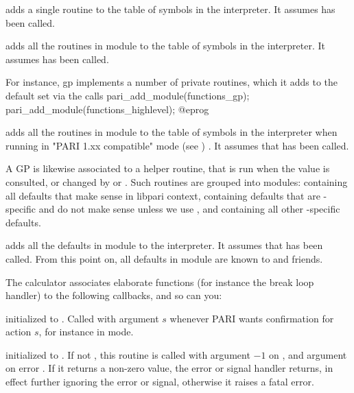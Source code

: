  adds a single routine to the
table of symbols in the interpreter. It assumes  has been
called.

 adds all the routines in module
 to the table of symbols in the interpreter. It assumes
 has been called.

\noindent For instance, gp implements a number of private routines, which
it adds to the default set via the calls
\bprog
  pari_add_module(functions_gp);
  pari_add_module(functions_highlevel);
@eprog

 adds all the routines in module
 to the table of symbols in the interpreter when running in
"PARI 1.xx compatible" mode (see ) . It assumes
that
 has been called.

A GP  is likewise associated to a helper routine, that is run
when the value is consulted, or changed by  or .
Such routines are grouped into modules:  containing all
defaults that make sense in libpari context, 
containing defaults that are -specific and do not make sense unless
we use , and  containing all other
-specific defaults.

 adds all the defaults in
module  to the interpreter. It assumes that  has
been called. From this point on, all defaults in module  are known
to  and friends.


The  calculator associates elaborate functions (for instance the
break loop handler) to the following callbacks, and so can you:

initialized to . Called with argument $s$ whenever PARI wants
confirmation for action $s$, for instance in  mode.

initialized to . If not , this routine is called with
argument $-1$ on , and argument  on error . If
it returns a non-zero value, the error or signal handler returns, in effect
further ignoring the error or signal, otherwise it raises a fatal error.


